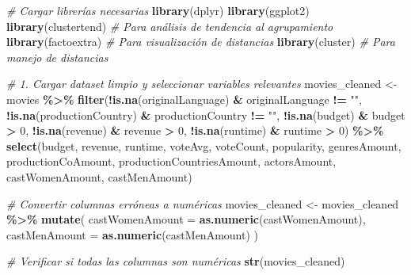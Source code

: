 \documentclass[
]{article}
\newenvironment{Shaded}{\begin{snugshade}}{\end{snugshade}}
\newcommand{\AttributeTok}[1]{\textcolor[rgb]{0.13,0.29,0.53}{#1}}
\newcommand{\CommentTok}[1]{\textcolor[rgb]{0.56,0.35,0.01}{\textit{#1}}}
\newcommand{\DecValTok}[1]{\textcolor[rgb]{0.00,0.00,0.81}{#1}}
\newcommand{\FunctionTok}[1]{\textcolor[rgb]{0.13,0.29,0.53}{\textbf{#1}}}
\newcommand{\NormalTok}[1]{#1}
\newcommand{\OtherTok}[1]{\textcolor[rgb]{0.56,0.35,0.01}{#1}}
\newcommand{\SpecialCharTok}[1]{\textcolor[rgb]{0.81,0.36,0.00}{\textbf{#1}}}
\newcommand{\StringTok}[1]{\textcolor[rgb]{0.31,0.60,0.02}{#1}}
\begin{document}
\begin{Shaded}
\begin{Highlighting}[]
\CommentTok{\# Cargar librerías necesarias}
\FunctionTok{library}\NormalTok{(dplyr)}
\FunctionTok{library}\NormalTok{(ggplot2)}
\FunctionTok{library}\NormalTok{(clustertend) }\CommentTok{\# Para análisis de tendencia al agrupamiento}
\FunctionTok{library}\NormalTok{(factoextra)  }\CommentTok{\# Para visualización de distancias}
\FunctionTok{library}\NormalTok{(cluster)     }\CommentTok{\# Para manejo de distancias}

\CommentTok{\# 1. Cargar dataset limpio y seleccionar variables relevantes}
\NormalTok{movies\_cleaned }\OtherTok{\textless{}{-}}\NormalTok{ movies }\SpecialCharTok{\%\textgreater{}\%}
  \FunctionTok{filter}\NormalTok{(}\SpecialCharTok{!}\FunctionTok{is.na}\NormalTok{(originalLanguage) }\SpecialCharTok{\&}\NormalTok{ originalLanguage }\SpecialCharTok{!=} \StringTok{""}\NormalTok{,}
         \SpecialCharTok{!}\FunctionTok{is.na}\NormalTok{(productionCountry) }\SpecialCharTok{\&}\NormalTok{ productionCountry }\SpecialCharTok{!=} \StringTok{""}\NormalTok{,}
         \SpecialCharTok{!}\FunctionTok{is.na}\NormalTok{(budget) }\SpecialCharTok{\&}\NormalTok{ budget }\SpecialCharTok{\textgreater{}} \DecValTok{0}\NormalTok{,}
         \SpecialCharTok{!}\FunctionTok{is.na}\NormalTok{(revenue) }\SpecialCharTok{\&}\NormalTok{ revenue }\SpecialCharTok{\textgreater{}} \DecValTok{0}\NormalTok{,}
         \SpecialCharTok{!}\FunctionTok{is.na}\NormalTok{(runtime) }\SpecialCharTok{\&}\NormalTok{ runtime }\SpecialCharTok{\textgreater{}} \DecValTok{0}\NormalTok{) }\SpecialCharTok{\%\textgreater{}\%}
  \FunctionTok{select}\NormalTok{(budget, revenue, runtime, voteAvg, voteCount, popularity, }
\NormalTok{         genresAmount, productionCoAmount, productionCountriesAmount, }
\NormalTok{         actorsAmount, castWomenAmount, castMenAmount)}

\CommentTok{\# Convertir columnas erróneas a numéricas}
\NormalTok{movies\_cleaned }\OtherTok{\textless{}{-}}\NormalTok{ movies\_cleaned }\SpecialCharTok{\%\textgreater{}\%}
  \FunctionTok{mutate}\NormalTok{(}
    \AttributeTok{castWomenAmount =} \FunctionTok{as.numeric}\NormalTok{(castWomenAmount),}
    \AttributeTok{castMenAmount =} \FunctionTok{as.numeric}\NormalTok{(castMenAmount)}
\NormalTok{  )}

\CommentTok{\# Verificar si todas las columnas son numéricas}
\FunctionTok{str}\NormalTok{(movies\_cleaned)  }
\end{Highlighting}
\end{Shaded}
\end{document}
